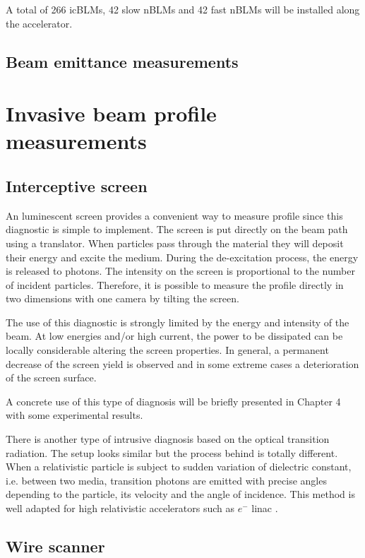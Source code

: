 \begin{refsection}
  A total of 266 icBLMs, 42 slow nBLMs and 42 fast nBLMs will be installed along the accelerator.

  \subsection{Beam emittance measurements}

  \section{Invasive beam profile measurements}
  \subsection{Interceptive screen}
  An luminescent screen provides a convenient way to measure profile since this diagnostic is simple to implement. The screen is put directly on the beam path using a translator. When particles pass through the material they will deposit their energy and excite the medium. During the de-excitation process, the energy is released to photons. The intensity on the screen is proportional to the number of incident particles. Therefore, it is possible to measure the profile directly in two dimensions with one camera by tilting the screen.

  The use of this diagnostic is strongly limited by the energy and intensity of the beam. At low energies and/or high current, the power to be dissipated can be locally considerable altering the screen properties. In general, a permanent decrease of the screen yield is observed \cite{Simon:IBIC2016-MOPG79} and in some extreme cases a deterioration of the screen surface.

  A concrete use of this type of diagnosis will be briefly presented in Chapter 4 with some experimental results.

  There is another type of intrusive diagnosis based on the optical transition radiation. The setup looks similar but the process behind is totally different. When a relativistic particle is subject to sudden variation of dielectric constant, i.e. between two media, transition photons are emitted with precise angles depending to the particle, its velocity and the angle of incidence. This method is well adapted for high relativistic accelerators such as $e^{-}$ \acrshort{linac} \cite{Nolle2009,Bolzon2013}.

  \subsection{Wire scanner}

\end{refsection}
